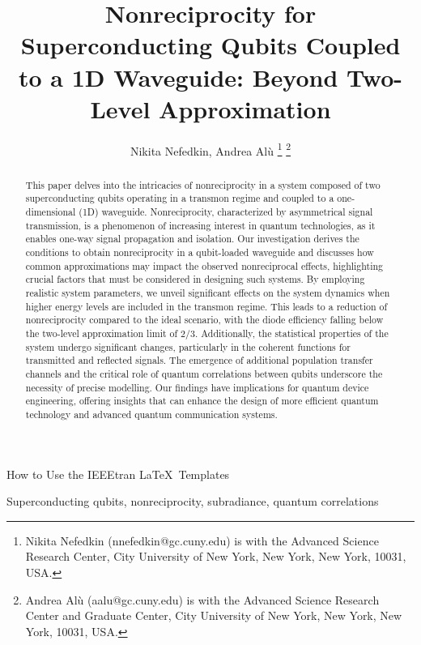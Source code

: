 \documentclass[lettersize,journal]{IEEEtran}
\begin{document}
\title{Nonreciprocity for Superconducting Qubits Coupled to a 1D Waveguide: Beyond Two-Level Approximation}
\author{Nikita Nefedkin, Andrea Al{\`u} 
\thanks{Nikita Nefedkin (nnefedkin@gc.cuny.edu) is with the Advanced Science Research Center, City University of New York, New York, New York, 10031, USA.}
\thanks{Andrea Al\`u (aalu@gc.cuny.edu) is with the Advanced Science Research Center and Graduate Center, City University of New York, New York, New York, 10031, USA.}}

%
{How to Use the IEEEtran \LaTeX \ Templates}

\maketitle

\begin{abstract}
This paper delves into the intricacies of nonreciprocity in a system composed of two superconducting qubits operating in a transmon regime and coupled to a one-dimensional (1D) waveguide. Nonreciprocity, characterized by asymmetrical signal transmission, is a phenomenon of increasing interest in quantum technologies, as it enables one-way signal propagation and isolation. Our investigation derives the conditions to obtain nonreciprocity in a qubit-loaded waveguide and discusses how common approximations may impact the observed nonreciprocal effects, highlighting crucial factors that must be considered in designing such systems. By employing realistic system parameters, we unveil significant effects on the system dynamics when higher energy levels are included in the transmon regime. This leads to a reduction of nonreciprocity compared to the ideal scenario, with the diode efficiency falling below the two-level approximation limit of $2/3$. Additionally, the statistical properties of the system undergo significant changes, particularly in the coherent functions for transmitted and reflected signals. The emergence of additional population transfer channels and the critical role of quantum correlations between qubits underscore the necessity of precise modelling. Our findings have implications for quantum device engineering, offering insights that can enhance the design of more efficient quantum technology and advanced quantum communication systems.
\end{abstract}

\begin{IEEEkeywords}
Superconducting qubits, nonreciprocity, subradiance, quantum correlations
\end{IEEEkeywords}
\end{document}
